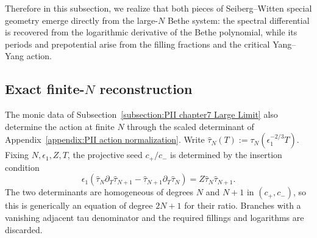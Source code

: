 \documentclass[a4paper,11pt]{article}
\numberwithin{equation}{section}
\begin{document}
Therefore in this subsection, we realize that both pieces of Seiberg–Witten special geometry emerge directly from the large-$N$ Bethe system: the spectral differential is recovered from the logarithmic derivative of the Bethe polynomial, while its periods and prepotential arise from the filling fractions and the critical Yang–Yang action.

\subsection{Exact finite-\texorpdfstring{$N$}{N} reconstruction}
\label{subsection:PII exact finite reconstruction}

The monic data of Subsection~\ref{subsection:PII chapter7 Large Limit}
also determine the action at finite $N$ through the scaled
determinant of Appendix~\ref{appendix:PII action normalization}.
Write $\widehat{\tau}_{N}(T):=\tau_{N}(\epsilon_{1}^{-2/3}T)$.
Fixing $N,\epsilon_{1},Z,T$, the projective seed $c_{+}/c_{-}$ is
determined by the insertion condition
\begin{equation}
\label{equation:PII exact seed condition}
\epsilon_{1}\left(
\widehat{\tau}_{N}\partial_{T}\widehat{\tau}_{N+1}
-\widehat{\tau}_{N+1}\partial_{T}\widehat{\tau}_{N}\right)
=Z\widehat{\tau}_{N}\widehat{\tau}_{N+1}.
\end{equation}
The two determinants are homogeneous of degrees $N$ and $N+1$ in
$(c_{+},c_{-})$, so this is generically an equation of degree
$2N+1$ for their ratio.  Branches with a vanishing adjacent tau
denominator and the required fillings and logarithms are discarded.
\end{document}
